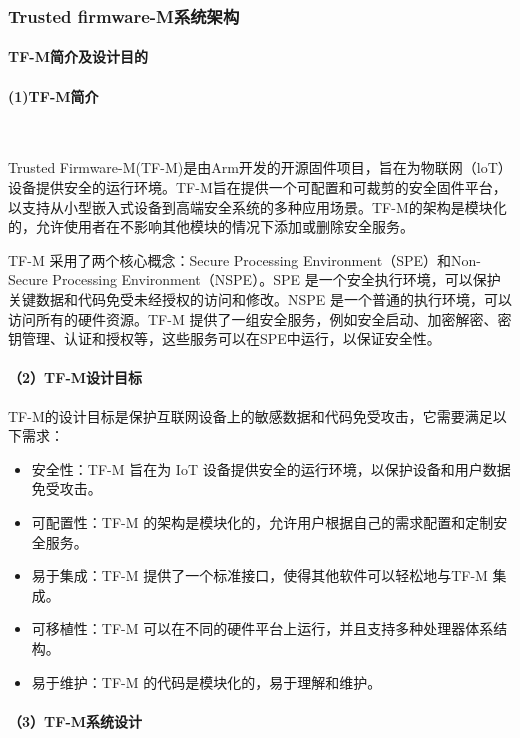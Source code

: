\documentclass[12pt,a4paper]{ctexart}
\begin{document}
\subsubsection{Trusted firmware-M系统架构}
\paragraph{TF-M简介及设计目的}
\paragraph{(1)TF-M简介}\mbox{}\\
\par Trusted Firmware-M(TF-M)是由Arm开发的开源固件项目，旨在为物联网（loT）设备提供安全的运行环境。TF-M旨在提供一个可配置和可裁剪的安全固件平台，以支持从小型嵌入式设备到高端安全系统的多种应用场景。TF-M的架构是模块化的，允许使用者在不影响其他模块的情况下添加或删除安全服务。
\par TF-M 采用了两个核心概念：Secure Processing Environment（SPE）和Non-Secure Processing Environment（NSPE）。SPE 是一个安全执行环境，可以保护关键数据和代码免受未经授权的访问和修改。NSPE 是一个普通的执行环境，可以访问所有的硬件资源。TF-M 提供了一组安全服务，例如安全启动、加密解密、密钥管理、认证和授权等，这些服务可以在SPE中运行，以保证安全性。

\paragraph{（2）TF-M设计目标}
\par TF-M的设计目标是保护互联网设备上的敏感数据和代码免受攻击，它需要满足以下需求：
\begin{itemize}
    \item 安全性：TF-M 旨在为 IoT 设备提供安全的运行环境，以保护设备和用户数据免受攻击。
    \item 可配置性：TF-M 的架构是模块化的，允许用户根据自己的需求配置和定制安全服务。
    \item 易于集成：TF-M 提供了一个标准接口，使得其他软件可以轻松地与TF-M 集成。
    \item 可移植性：TF-M 可以在不同的硬件平台上运行，并且支持多种处理器体系结构。
    \item 易于维护：TF-M 的代码是模块化的，易于理解和维护。
\end{itemize}

\paragraph{（3）TF-M系统设计}\mbox{}\\
\end{document}
